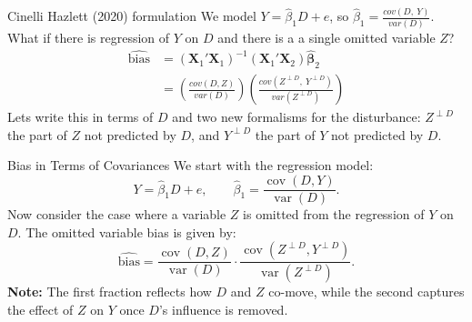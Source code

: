 \documentclass[aspectratio=169, handout, t]{beamer}
\numberwithin{equation}{section}
\begin{document}
\begin{frame}{Cinelli Hazlett (2020) formulation}
We model $Y=\hat{\beta}_1D+e$, so $\hat{\beta}_1=\frac{cov(D,\ Y)}{var(D)}$.\\
\bigskip
What if there is regression of $Y$ on $D$ and there is a a single omitted variable $Z$?
\begin{align*}
\widehat{\text{bias}} &= (\bm{X}_1'\bm{X}_1)^{-1}(\bm{X}_1'\bm{X}_2)\bm{\hat{\beta}}_2\\
 &=\left(\frac{cov(D, Z)}{var(D)}\right)\left(\frac{cov(Z^{\perp D},\ Y^{\perp D})}{var(Z^{\perp D})}\right)
 \end{align*}
 Lets write this in terms of $D$ and two new formalisms for the disturbance: $Z^{\perp D}$ the part of $Z$ not predicted by $D$, and $Y^{\perp D}$ the part of $Y$ not predicted by $D$. 
\end{frame}

%

\begin{frame}{Bias in Terms of Covariances}
We start with the regression model:
\[
Y = \hat{\beta}_1 D + e,\qquad \hat{\beta}_1 = \frac{\operatorname{cov}(D,Y)}{\operatorname{var}(D)}.
\]
\vspace{1ex}
Now consider the case where a variable \(Z\) is omitted from the regression of \(Y\) on \(D\).  
The omitted variable bias is given by:
\[
\widehat{\text{bias}} = \frac{\operatorname{cov}(D,Z)}{\operatorname{var}(D)}\cdot\frac{\operatorname{cov}(Z^{\perp D},Y^{\perp D})}{\operatorname{var}(Z^{\perp D})}.
\]
\textbf{Note:}  
The first fraction reflects how \(D\) and \(Z\) co-move, while the second captures the effect of \(Z\) on \(Y\) once \(D\)’s influence is removed.
\end{frame}
\end{document}
